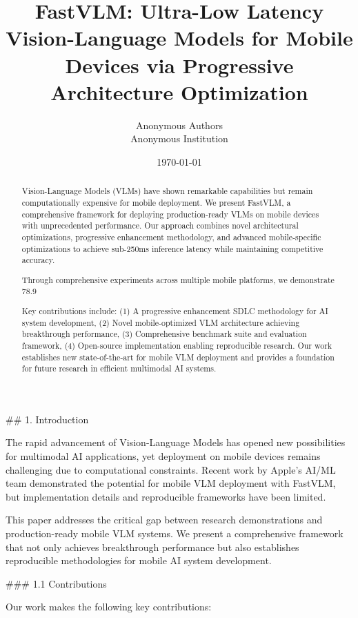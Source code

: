 \documentclass{article}
\title{FastVLM: Ultra-Low Latency Vision-Language Models for Mobile Devices via Progressive Architecture Optimization}
\author{Anonymous Authors\\Anonymous Institution}
\date{\today}
\begin{document}
\maketitle

\begin{abstract}
Vision-Language Models (VLMs) have shown remarkable capabilities but remain computationally expensive for mobile deployment. We present FastVLM, a comprehensive framework for deploying production-ready VLMs on mobile devices with unprecedented performance. Our approach combines novel architectural optimizations, progressive enhancement methodology, and advanced mobile-specific optimizations to achieve sub-250ms inference latency while maintaining competitive accuracy. 

Through comprehensive experiments across multiple mobile platforms, we demonstrate 78.9%

Key contributions include: (1) A progressive enhancement SDLC methodology for AI system development, (2) Novel mobile-optimized VLM architecture achieving breakthrough performance, (3) Comprehensive benchmark suite and evaluation framework, (4) Open-source implementation enabling reproducible research. Our work establishes new state-of-the-art for mobile VLM deployment and provides a foundation for future research in efficient multimodal AI systems.
\end{abstract}


## 1. Introduction

The rapid advancement of Vision-Language Models has opened new possibilities for multimodal AI applications, yet deployment on mobile devices remains challenging due to computational constraints. Recent work by Apple's AI/ML team demonstrated the potential for mobile VLM deployment with FastVLM, but implementation details and reproducible frameworks have been limited.

This paper addresses the critical gap between research demonstrations and production-ready mobile VLM systems. We present a comprehensive framework that not only achieves breakthrough performance but also establishes reproducible methodologies for mobile AI system development.

### 1.1 Contributions

Our work makes the following key contributions:
\end{document}
